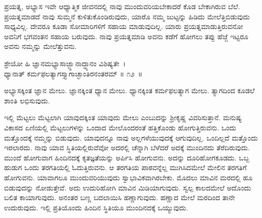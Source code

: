ಪ್ರಯತ್ನ, ಅಭ್ಯಾಸ ಇವೇ ಆಧ್ಯಾತ್ಮಿಕ ಜೀವನದಲ್ಲಿ ನಾವು ಮುಂದುವರಿಯಬೇಕಾದರೆ ಕೊಡ ಬೇಕಾಗಿರುವ ಬೆಲೆ. ಪ್ರಯತ್ನಮಾಡದೆ ನಾವು ಸುಮ್ಮನೆ ಕುಳಿತುಕೊಂಡಿರುವುದು, ಯಾರೊ ನಮ್ಮ ಜುಟ್ಟನ್ನು ಹಿಡಿದು ಮೇಲೆತ್ತಿಬಿಡುವುದು ಸಾಧ್ಯವಿಲ್ಲ. ದೇವರೂ ಕೂಡಾ ಸೋಮಾರಿಗಳಿಗೆ ಸಹಾಯ ಮಾಡುವುದಿಲ್ಲ. ಯಾರು ಪ್ರಯತ್ನಮಾಡುತ್ತಿರುವನೋ ಅವನಿಗೆ ಭಗವಂತನ ಸಹಾಯ ಬರುವುದು. ನಾವು ಪ್ರಯತ್ನಮಾಡಿ ಅವನು ಕಡೆಗೆ ಹೋಗಲು ತಪ್ಪು ಹೆಜ್ಜೆ ಇಟ್ಟರೂ ಅವನು ನಮ್ಮನ್ನು ಮೇಲೆತ್ತುವನು.

\begin{shloka}
ಶ್ರೇಯೋ ಹಿ ಜ್ಞಾನಮಭ್ಯಾಸಾಜ್ಜ್ಞಾನಾದ್ಧ್ಯಾನಂ ವಿಶಿಷ್ಯತೇ~।\\ಧ್ಯಾನಾತ್ ಕರ್ಮಫಲತ್ಯಾಗಸ್ತ್ಯಾಗಾಚ್ಛಾಂತಿರನಂತರಮ್ \hfill॥ ೧೨~॥
\end{shloka}

\begin{artha}
ಅಭ್ಯಾಸಕ್ಕಿಂತ ಜ್ಞಾನ ಮೇಲು. ಜ್ಞಾನಕ್ಕಿಂತ ಧ್ಯಾನ ಮೇಲು. ಧ್ಯಾನಕ್ಕಿಂತ ಕರ್ಮಫಲತ್ಯಾಗ ಮೇಲು. ತ್ಯಾಗದಿಂದ ಕೂಡಲೆ ಶಾಂತಿ ಲಭಿಸುವುದು.
\end{artha}

ಇಲ್ಲಿ ಮೆಟ್ಟಲು ಮೆಟ್ಟಲಾಗಿ ಯಾವುದಕ್ಕಿಂತ ಯಾವುದು ಮೇಲು ಎಂಬುದನ್ನು ಶ‍್ರೀಕೃಷ್ಣ ವಿವರಿಸುತ್ತಾನೆ. ಮನುಷ್ಯ ವಿಕಾಸದ ಏಣಿಯಲ್ಲಿ ಮೆಟ್ಟಲುಗಳನ್ನು ಒಂದಾದ ಮೇಲೊಂದರಂತೆ ಹತ್ತಿಕೊಂಡು ಹೋಗುತ್ತಿರುವನು. ಒಂದು ಮತ್ತೊಂದಕ್ಕೆ ನಮ್ಮನ್ನು ಬಿಡುವುದು. ಯಾವುದನ್ನೂ ನಾವು ಅಲ್ಲಗಳೆಯುವುದಕ್ಕೆ ಆಗುವುದಿಲ್ಲ. ಒಂದಿಲ್ಲದೆ ಮತ್ತೊಂದು ಇರಲಾರದು. ನಾವು ಯಾವ ಸ್ಥಿತಿಯಲ್ಲಿರುವೆವೋ ಅದರಲ್ಲಿ ಚೆನ್ನಾಗಿ ಬೆಳೆದರೆ ಅದಕ್ಕೆ ಮುಂದಿನದು ತೆರೆದಿರುವುದು. ಮುಂದೆ ಹೋಗುವಾಗ ಹಿಂದಿನದಕ್ಕೆ ಕೃತಜ್ಞತೆಯನ್ನು ಅರ್ಪಿಸಿ ಹೋಗುವನು. ಅದನ್ನು ದೂರಿ\break ಹೋಗಕೂಡದು. ಒಬ್ಬ ಹುಡುಗ ಒಂದು ತರಗತಿಯಲ್ಲಿ ಓದುತ್ತಿರುವನು. ಆ ತರಗತಿಯ ಪಾಠವನ್ನೆಲ್ಲ ಮುಗಿಸಿದಮೇಲೆ ಮೇಲಿನ ತರಗತಿಗೆ ಹೋಗುವನು. ಯಾವಾಗಲೂ ಮುಂದು\-ವರಿಯುವುದು ಸ್ವಾಭಾವಿಕವಾಗಿರಬೇಕು. ಮೊದಲು ಮಾವಿನ ಮರದಲ್ಲಿ ಹೂ ಬಿಡುವುದನ್ನು ನೋಡುತ್ತೇವೆ. ಅದು ಉದುರಿಹೋಗಿ ಮಾವಿನ ಮಿಡಿಯಾಗುವುದು. ಸ್ವಲ್ಪ ಕಾಲದಮೇಲೆ ಅದೊಂದು ಬಲಿತ ಕಾಯಾಗುವುದು. ಅನಂತರ ಬಣ್ಣ ಬದಲಾಯಿಸಿ ಹಣ್ಣಾಗುವುದು. ಹಣ್ಣಾದ ಮೇಲೆ ಮರದಿಂದ ತಾನೇ ಉದುರುವುದು. ಇಲ್ಲಿ ಪ್ರತಿಯೊಂದು ಹಿಂದಿನ ಸ್ಥಿತಿಯೂ ಮುಂದಿನದಕ್ಕೆ ಒಯ್ಯುವುದು.

